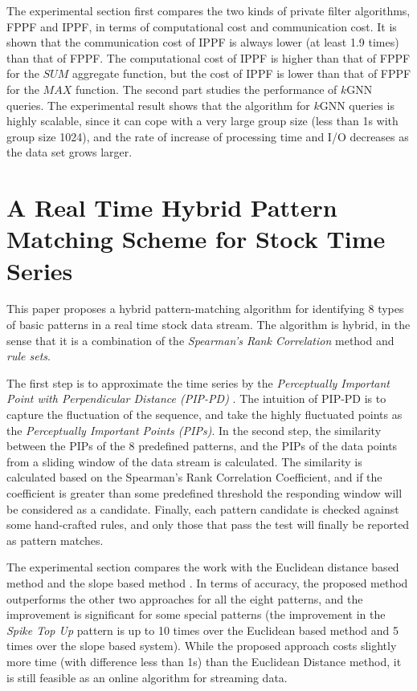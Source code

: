 \documentclass[paper=a4, fontsize=18pt]{article} %
\numberwithin{equation}{section} %
\numberwithin{figure}{section} %
\numberwithin{table}{section} %
\begin{document}
The experimental section first compares the two kinds of private filter algorithms, FPPF and IPPF, in terms of computational cost and communication cost. It is shown that the communication cost of IPPF is always lower (at least 1.9 times) than that of FPPF. The computational cost of IPPF is higher than that of FPPF for the $SUM$ aggregate function, but the cost of IPPF is lower than that of FPPF for the $MAX$ function. The second part studies the performance of $k$GNN queries. The experimental result shows that the algorithm for $k$GNN queries is highly scalable, since it can cope with a very large group size (less than 1s with group size 1024), and the rate of increase of processing time and I/O decreases as the data set grows larger.

\section{A Real Time Hybrid Pattern Matching Scheme for Stock Time Series \cite{ZJLLWZ10}}

This paper proposes a hybrid pattern-matching algorithm for identifying 8 types of basic patterns in a real time stock data stream. The algorithm is hybrid, in the sense that it is a combination of the \emph{Spearman's Rank Correlation} method and \emph{rule sets}.

The first step is to approximate the time series by the \emph{Perceptually Important Point with Perpendicular Distance  (PIP-PD)} \cite{FCLN07}. The intuition of PIP-PD is to capture the fluctuation of the sequence, and take the highly fluctuated points as the \emph{Perceptually Important Points (PIPs)}. In the second step, the similarity between the PIPs of the 8 predefined patterns, and the PIPs of the data points from a sliding window of the data stream is calculated. The similarity is calculated based on the Spearman's Rank Correlation Coefficient, and if the coefficient is greater than some predefined threshold the responding window will be considered as a candidate. Finally, each pattern candidate is checked against some hand-crafted rules, and only those that pass the test will finally be reported as pattern matches.

The experimental section compares the work with the Euclidean distance based method \cite{KS97} and the slope based method \cite{TJ05}. In terms of accuracy, the proposed method outperforms the other two approaches for all the eight patterns, and the improvement is significant for some special patterns (the improvement in the \emph{Spike Top Up} pattern is up to 10 times over the Euclidean based method and 5 times over the slope based system). While the proposed approach costs slightly more time (with difference less than 1s) than the Euclidean Distance method, it is still feasible as an online algorithm for streaming data.
\end{document}
